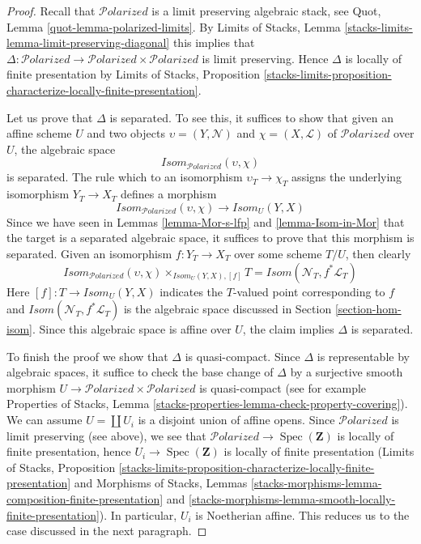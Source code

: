 \documentclass[10pt,a4paper]{amsart}
\theoremstyle{plain}
\theoremstyle{definition}
\theoremstyle{remark}
\numberwithin{equation}{subsection}
\def\Spec{\mathop{\mathrm{Spec}}}
\def\Polarizedstack{\mathcal{P}\!\mathit{olarized}}
\begin{document}
\begin{proof}
Recall that $\Polarizedstack$ is a limit preserving algebraic stack, see
Quot, Lemma \ref{quot-lemma-polarized-limits}.
By Limits of Stacks, Lemma \ref{stacks-limits-lemma-limit-preserving-diagonal}
this implies that
$\Delta : \Polarizedstack \to \Polarizedstack \times \Polarizedstack$
is limit preserving. Hence $\Delta$ is locally of finite presentation
by Limits of Stacks, Proposition
\ref{stacks-limits-proposition-characterize-locally-finite-presentation}.

\medskip\noindent
Let us prove that $\Delta$ is separated. To see this, it suffices to show
that given an affine scheme $U$ and two objects
$\upsilon = (Y, \mathcal{N})$ and $\chi = (X, \mathcal{L})$
of $\Polarizedstack$ over $U$, the algebraic
space
$$
\mathit{Isom}_{\Polarizedstack}(\upsilon, \chi)
$$
is separated. The rule which to an isomorphism $\upsilon_T \to \chi_T$
assigns the underlying isomorphism $Y_T \to X_T$ defines a morphism
$$
\mathit{Isom}_{\Polarizedstack}(\upsilon, \chi)
\longrightarrow
\mathit{Isom}_U(Y, X)
$$
Since we have seen in Lemmas \ref{lemma-Mor-s-lfp} and
\ref{lemma-Isom-in-Mor} that the target is
a separated algebraic space, it suffices to prove that this morphism
is separated. Given an isomorphism $f : Y_T \to X_T$
over some scheme $T/U$, then clearly
$$
\mathit{Isom}_{\Polarizedstack}(\upsilon, \chi)
\times_{\mathit{Isom}_U(Y, X), [f]} T
=
\mathit{Isom}(\mathcal{N}_T, f^*\mathcal{L}_T)
$$
Here $[f] : T \to \mathit{Isom}_U(Y, X)$ indicates the $T$-valued
point corresponding to $f$ and
$\mathit{Isom}(\mathcal{N}_T, f^*\mathcal{L}_T)$
is the algebraic space discussed in Section \ref{section-hom-isom}.
Since this algebraic space is affine over $U$, the claim implies
$\Delta$ is separated.

\medskip\noindent
To finish the proof we show that $\Delta$ is quasi-compact. Since
$\Delta$ is representable by algebraic spaces, it suffice to check
the base change of $\Delta$ by a surjective smooth morphism
$U \to \Polarizedstack \times \Polarizedstack$ is quasi-compact
(see for example Properties of Stacks, Lemma
\ref{stacks-properties-lemma-check-property-covering}).
We can assume $U = \coprod U_i$ is a disjoint union of affine opens.
Since $\Polarizedstack$ is limit preserving (see above), we
see that $\Polarizedstack \to \Spec(\mathbf{Z})$ is locally of
finite presentation, hence $U_i \to \Spec(\mathbf{Z})$ is
locally of finite presentation
(Limits of Stacks, Proposition
\ref{stacks-limits-proposition-characterize-locally-finite-presentation}
and Morphisms of Stacks, Lemmas
\ref{stacks-morphisms-lemma-composition-finite-presentation} and
\ref{stacks-morphisms-lemma-smooth-locally-finite-presentation}).
In particular, $U_i$ is Noetherian affine. This reduces us to the
case discussed in the next paragraph.


\end{proof}
\end{document}
